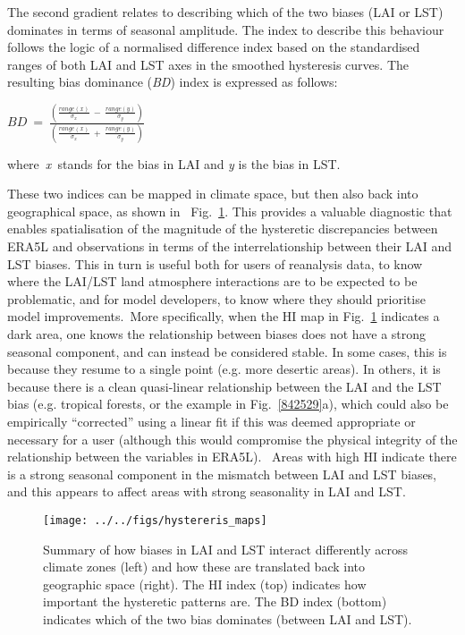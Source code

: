 \documentclass[gmd, manuscript]{copernicus}
\begin{document}
{The second gradient relates to describing which of the two biases (LAI or LST) 
dominates in terms of seasonal amplitude. The index to describe this behaviour 
follows the logic of a normalised difference index based on the standardised ranges
of both LAI and LST axes in the smoothed hysteresis curves. The
resulting bias dominance (\emph{BD}) index is expressed as follows:

\(BD\ =\ \frac{\left(\frac{range\left(x\right)}{\sigma_x}\ -\ 
\frac{range\left(y\right)}{\sigma_y}\right)}{\left(\frac{range\left(x\right)}{\sigma_x}\ 
+\ 
\frac{range\left(y\right)}{\sigma_y}\right)}\)

where~\emph{x~}stands for the bias in LAI and \emph{y} is the bias in
LST.

{These two indices can be mapped in climate space, but then also back
into geographical space, as shown in~
Fig.~}{\ref{988186}}{.} This provides a valuable
diagnostic that enables spatialisation of the magnitude of the
hysteretic discrepancies between ERA5L and observations in terms of the
interrelationship between their LAI and LST biases. This in turn is
useful both for users of reanalysis data, to know where the LAI/LST land
atmosphere interactions are to be expected to be problematic, and for
model developers, to know where they should prioritise model
improvements.~{{More specifically, when the HI map in
Fig.~}}{\ref{988186}}{ indicates a dark area, one knows
the relationship between biases does not have a strong seasonal
component}, and can instead be considered stable. In some cases, this is
because they resume to a single point (e.g. more desertic areas). In
others, it is because there is a clean quasi-linear relationship between
the LAI and the LST bias (e.g. tropical forests, or the example in
Fig.~{\ref{842529}}a), which could also be empirically
``corrected'' using a linear fit if this was deemed appropriate or
necessary for a user (although this would compromise the physical
integrity of the relationship between the variables in ERA5L).~ Areas
with high HI indicate there is a strong seasonal component in the
mismatch between LAI and LST biases, and this appears to affect areas
with strong seasonality in LAI and LST.

\par\null\selectlanguage{english}
\begin{figure}[H]
\begin{center}
\texttt{[image: ../../figs/hystereris\_maps]}
\caption{{{Summary of how biases in LAI and LST interact} differently across
climate zones (left) and how these are translated back into geographic
space (right). {The HI index (top) indicates how important the
hysteretic patterns are. The BD index (bottom) indicates which of the
two bias dominates (between LAI and LST).}~
{\label{988186}}%
}}
\end{center}
\end{figure}

}
\end{document}
